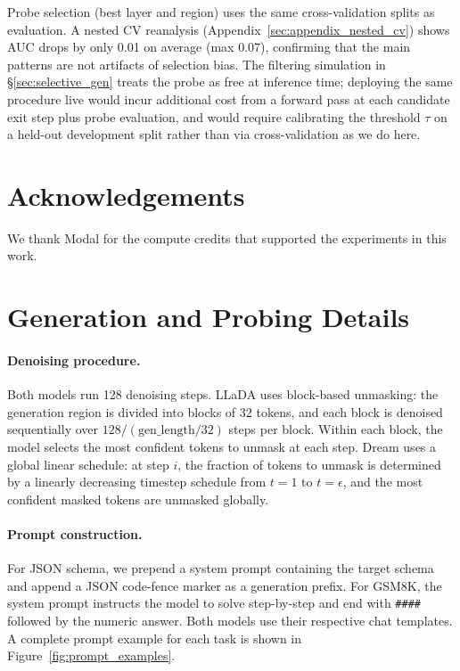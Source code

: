 \documentclass[11pt]{article}
\begin{document}
Probe selection (best layer and region) uses the same cross-validation splits as evaluation. A nested CV reanalysis (Appendix~\ref{sec:appendix_nested_cv}) shows AUC drops by only 0.01 on average (max 0.07), confirming that the main patterns are not artifacts of selection bias.
The filtering simulation in \S\ref{sec:selective_gen} treats the probe as free at inference time; deploying the same procedure live would incur additional cost from a forward pass at each candidate exit step plus probe evaluation, and would require calibrating the threshold $\tau$ on a held-out development split rather than via cross-validation as we do here.

\section*{Acknowledgements}
We thank Modal for the compute credits that supported the experiments in this work.



\appendix

\section{Generation and Probing Details}
\label{sec:appendix_generation}

\paragraph{Denoising procedure.}
Both models run 128 denoising steps.
LLaDA uses block-based unmasking: the generation region is divided into blocks of 32 tokens, and each block is denoised sequentially over $128 / (\text{gen\_length} / 32)$ steps per block.
Within each block, the model selects the most confident tokens to unmask at each step.
Dream uses a global linear schedule: at step $i$, the fraction of tokens to unmask is determined by a linearly decreasing timestep schedule from $t=1$ to $t=\epsilon$, and the most confident masked tokens are unmasked globally.

\paragraph{Prompt construction.}
For JSON schema, we prepend a system prompt containing the target schema and append a JSON code-fence marker as a generation prefix.
For GSM8K, the system prompt instructs the model to solve step-by-step and end with \texttt{\#\#\#\#} followed by the numeric answer.
Both models use their respective chat templates.
A complete prompt example for each task is shown in Figure~\ref{fig:prompt_examples}.
\end{document}

